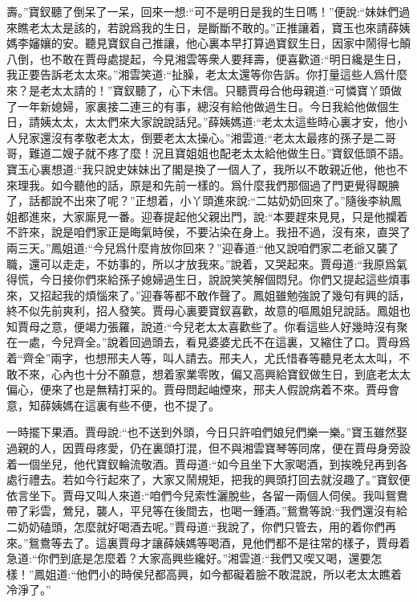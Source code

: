 \begin{parag}
壽。”寶釵聽了倒呆了一呆，回來一想:“可不是明日是我的生日嗎！”便說:“妹妹們過來瞧老太太是該的，若說爲我的生日，是斷斷不敢的。”正推讓着，寶玉也來請薛姨媽李嬸孃的安。聽見寶釵自己推讓，他心裏本早打算過寶釵生日，因家中鬧得七顛八倒，也不敢在賈母處提起，今見湘雲等衆人要拜壽，便喜歡道:“明日纔是生日，我正要告訴老太太來。”湘雲笑道:“扯臊，老太太還等你告訴。你打量這些人爲什麼來？是老太太請的！”寶釵聽了，心下未信。只聽賈母合他母親道:“可憐寶丫頭做了一年新媳婦，家裏接二連三的有事，總沒有給他做過生日。今日我給他做個生日，請姨太太，太太們來大家說說話兒。”薛姨媽道:“老太太這些時心裏才安，他小人兒家還沒有孝敬老太太，倒要老太太操心。”湘雲道:“老太太最疼的孫子是二哥哥，難道二嫂子就不疼了麼！況且寶姐姐也配老太太給他做生日。”寶釵低頭不語。寶玉心裏想道:“我只說史妹妹出了閣是換了一個人了，我所以不敢親近他，他也不來理我。如今聽他的話，原是和先前一樣的。爲什麼我們那個過了門更覺得靦腆了，話都說不出來了呢？”正想着，小丫頭進來說:“二姑奶奶回來了。”隨後李紈鳳姐都進來，大家廝見一番。迎春提起他父親出門，說:“本要趕來見見，只是他攔着不許來，說是咱們家正是晦氣時侯，不要沾染在身上。我扭不過，沒有來，直哭了兩三天。”鳳姐道:“今兒爲什麼肯放你回來？”迎春道:“他又說咱們家二老爺又襲了職，還可以走走，不妨事的，所以才放我來。”說着，又哭起來。賈母道:“我原爲氣得慌，今日接你們來給孫子媳婦過生日，說說笑笑解個悶兒。你們又提起這些煩事來，又招起我的煩惱來了。”迎春等都不敢作聲了。鳳姐雖勉強說了幾句有興的話，終不似先前爽利，招人發笑。賈母心裏要寶釵喜歡，故意的嘔鳳姐兒說話。鳳姐也知賈母之意，便竭力張羅，說道:“今兒老太太喜歡些了。你看這些人好幾時沒有聚在一處，今兒齊全。”說着回過頭去，看見婆婆尤氏不在這裏，又縮住了口。賈母爲着“齊全”兩字，也想邢夫人等，叫人請去。邢夫人，尤氏惜春等聽見老太太叫，不敢不來，心內也十分不願意，想着家業零敗，偏又高興給寶釵做生日，到底老太太偏心，便來了也是無精打采的。賈母問起岫煙來，邢夫人假說病着不來。賈母會意，知薛姨媽在這裏有些不便，也不提了。
\end{parag}


\begin{parag}
    一時擺下果酒。賈母說:“也不送到外頭，今日只許咱們娘兒們樂一樂。”寶玉雖然娶過親的人，因賈母疼愛，仍在裏頭打混，但不與湘雲寶琴等同席，便在賈母身旁設着一個坐兒，他代寶釵輪流敬酒。賈母道:“如今且坐下大家喝酒，到挨晚兒再到各處行禮去。若如今行起來了，大家又鬧規矩，把我的興頭打回去就沒趣了。”寶釵便依言坐下。賈母又叫人來道:“咱們今兒索性灑脫些，各留一兩個人伺侯。我叫鴛鴦帶了彩雲，鶯兒，襲人，平兒等在後間去，也喝一鍾酒。”鴛鴦等說:“我們還沒有給二奶奶磕頭，怎麼就好喝酒去呢。”賈母道:“我說了，你們只管去，用的着你們再來。”鴛鴦等去了。這裏賈母才讓薛姨媽等喝酒，見他們都不是往常的樣子，賈母着急道:“你們到底是怎麼着？大家高興些纔好。”湘雲道:“我們又喫又喝，還要怎樣！”鳳姐道:“他們小的時侯兒都高興，如今都礙着臉不敢混說，所以老太太瞧着冷淨了。”
\end{parag}


